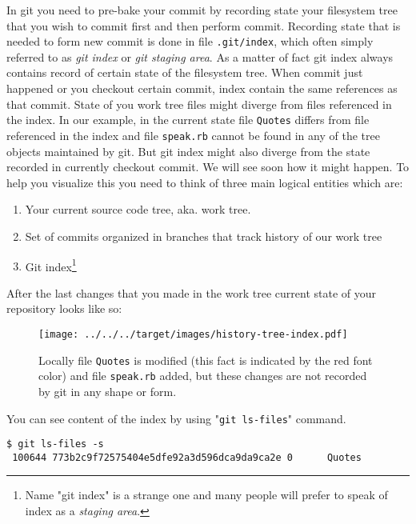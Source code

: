 \documentclass{article}
\theoremstyle{definition}
\begin{document}
        In git you need to pre-bake your commit by recording state your filesystem tree that you wish to commit first
        and then perform commit. Recording state that is needed to form new commit is done in file \texttt{.git/index},
        which often simply referred to as {\em git index} or {\em git staging area}. As a matter of fact git index
        always contains record of certain state of the filesystem tree. When commit just happened or you checkout
        certain commit, index contain the same references as that commit. State of you work tree files might diverge
        from files referenced in the index. In our example, in the current state file \texttt{Quotes} differs from file
        referenced in the index and file \texttt{speak.rb} cannot be found in any of the tree objects maintained by git.
        But git index might also diverge from the state recorded in currently checkout commit. We will see soon how it
        might happen. To help you visualize this you need to think of three main logical entities which are:
        \begin{enumerate}
                \item Your current source code tree, aka. work tree.
                \item Set of commits organized in branches that track history of our work tree
                \item Git index\footnote{Name "git index" is a strange one and many people will prefer to speak of index as a {\em staging area}.}
        \end{enumerate}
        \newpage
        \noindent After the last changes that you made in the work tree current state of your repository looks like so:
        \begin{figure}[h]
        \centering\texttt{[image: ../../../target/images/history-tree-index.pdf]}
        \caption{Locally file \texttt{Quotes} is modified (this fact is indicated by the red font color) and file
          \texttt{speak.rb} added, but these changes are not recorded by git in any shape or form.\label{fig:history-tree-index}}
        \end{figure}

        \noindent You can see content of the index by using "\texttt{git ls-files}" command.

    \begin{Verbatim}[frame=single]
 $ git ls-files -s
 100644 773b2c9f72575404e5dfe92a3d596dca9da9ca2e 0      Quotes
        \end{Verbatim}
\end{document}
